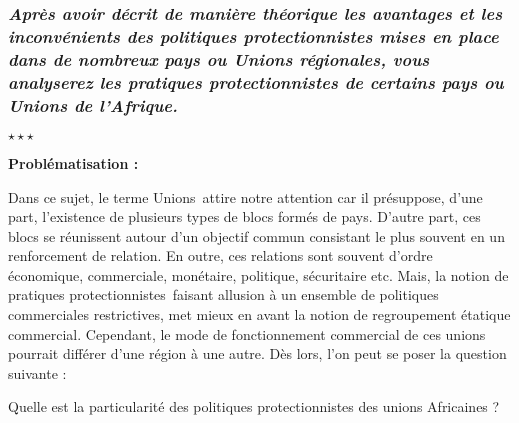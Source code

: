 
\newpage %
	\subsubsection*{\textit{Après avoir décrit de manière théorique les avantages et les inconvénients des politiques protectionnistes mises en place dans de nombreux pays ou Unions régionales, vous analyserez les pratiques protectionnistes de certains pays ou Unions de l'Afrique.}}
\begin{center}
	$\star \star \star$
\end{center}

\noindent\textbf{Problématisation :} 

Dans ce sujet, le terme \guillemetleft Unions\guillemetright\ attire notre attention car il présuppose, d'une part, l'existence de plusieurs types de blocs formés de pays. D'autre part, ces blocs se réunissent autour d'un objectif commun consistant le plus souvent en un renforcement de relation. En outre, ces relations sont souvent d'ordre économique, commerciale, monétaire, politique, sécuritaire etc. Mais, la notion de \guillemetleft pratiques protectionnistes\guillemetright\ faisant allusion à un ensemble de politiques commerciales restrictives, met mieux en avant la notion de regroupement étatique commercial. Cependant, le mode de fonctionnement commercial de ces unions pourrait différer d'une région à une autre. Dès lors, l'on peut se poser la question suivante :

Quelle est la particularité des politiques protectionnistes des unions Africaines ?

 